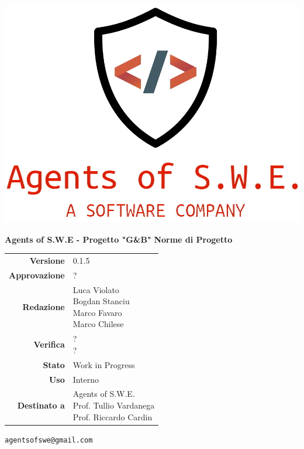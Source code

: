 


\begin{titlepage}
\thispagestyle{empty}

\begin{center}

\includegraphics[scale=0.3]{./images/logo.png} 

\large \textbf{Agents of S.W.E - Progetto "G\&B"}
\vfill
\Huge \textbf{Norme di Progetto}
\vfill
\large
\renewcommand{\arraystretch}{1.3}
\begin{tabular}{r|l}

\textbf{Versione} & 0.1.5\\

\textbf{Approvazione} & ?\\
\textbf{Redazione} & \parbox[t]{5cm}{Luca Violato\\Bogdan Stanciu\\Marco Favaro\\Marco Chilese}\\\
\textbf{Verifica} & \parbox[t]{5cm}{?\\?}\\
\textbf{Stato} & Work in Progress\\
\textbf{Uso} & Interno\\
\textbf{Destinato a} & \parbox[t]{5cm}{Agents of S.W.E. \\Prof. Tullio Vardanega\\Prof. Riccardo Cardin}
\end{tabular}
\vfill
\small
\texttt{agentsofswe@gmail.com}
\end{center}
\end{titlepage}

